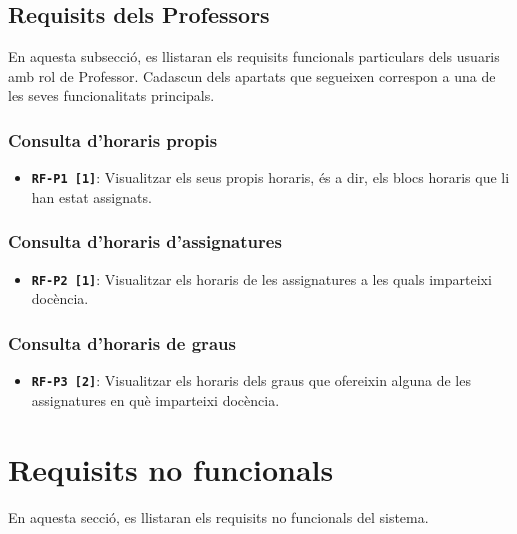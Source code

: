 \documentclass[a4paper,12pt]{ThesisStyle}
\begin{document}
\subsection{Requisits dels Professors}
\label{subsec:requisits_professors}

En aquesta subsecció, es llistaran els requisits funcionals particulars dels usuaris amb rol de Professor. Cadascun dels apartats que segueixen correspon a una de les seves funcionalitats principals.

\subsubsection{Consulta d'horaris propis}
\begin{itemize}
  \item \texttt{\textbf{RF-P1 [1]}}: Visualitzar els seus propis horaris, és a dir, els blocs horaris que li han estat assignats.
\end{itemize}

\subsubsection{Consulta d'horaris d'assignatures}
\begin{itemize}
  \item \texttt{\textbf{RF-P2 [1]}}: Visualitzar els horaris de les assignatures a les quals imparteixi docència.
\end{itemize}

\subsubsection{Consulta d'horaris de graus}
\begin{itemize}
  \item \texttt{\textbf{RF-P3 [2]}}: Visualitzar els horaris dels graus que ofereixin alguna de les assignatures en què imparteixi docència.
\end{itemize}

\section{Requisits no funcionals}
\label{sec:requisits_no_funcionals}

En aquesta secció, es llistaran els requisits no funcionals del sistema.
\end{document}
